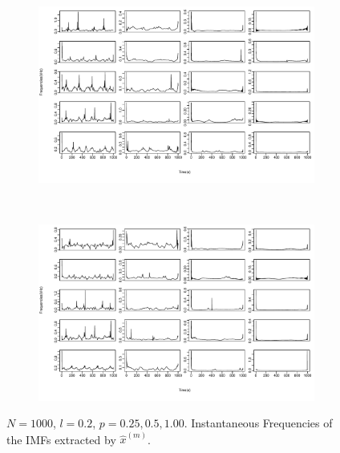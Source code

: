 \documentclass[11pt, a4paper]{article} %
\begin{document}
\begin{figure}
\begin{subfigure}{1.1\textwidth}
  \centering
  \includegraphics[width=\linewidth]{IF_N1000_l020_m_1_5.pdf}
  \label{fig:sfig1}
\end{subfigure}\\
\begin{subfigure}{1.1\textwidth}
  \centering
  \includegraphics[width=\linewidth]{IF_N1000_l020_m_6_10.pdf}
  \label{fig:sfig2}
\end{subfigure}
\label{fig1}
\caption{$N = 1000$, $l = 0.2$, $p = 0.25, 0.5, 1.00$. Instantaneous Frequencies of the IMFs extracted by $\hat{x}^{(m)}$.}
\end{figure}

\restoregeometry



\end{document}
